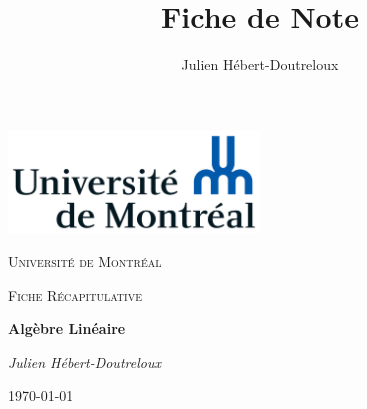 \documentclass{article}[french, babel]
\author{Julien Hébert-Doutreloux}
\title{Fiche de Note}
\begin{document}
		\begin{titlepage}
		\centering
		\includegraphics[width=0.5\textwidth]{Universite_de_Montreal_logo}\par\vspace{1cm}
		{\scshape\LARGE Université de Montréal\par}
		\vspace{1cm}
		{\scshape\Large Fiche Récapitulative\par}
		\vspace{1.5cm}
		{\huge\bfseries Algèbre Linéaire\par}
		\vspace{2cm}
		{\Large\itshape Julien Hébert-Doutreloux\par}
		\vfill
		\vfill
		{\large \today\par}
	\end{titlepage}
\setcounter{page}{2}
	\tableofcontents
	\newpage
	
	\newpage\printindex
\end{document}
